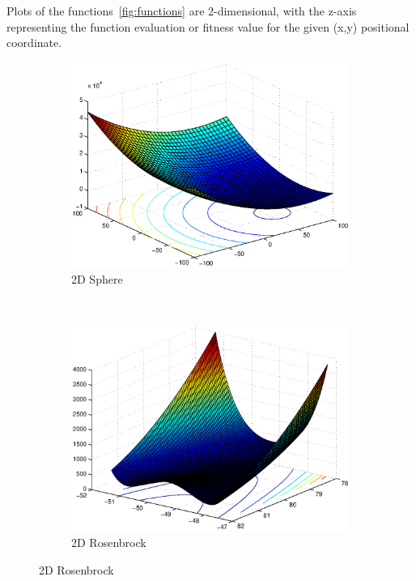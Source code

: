 \documentclass{csfourzero}
\begin{document}
Plots of the functions~\ref{fig:functions} are 2-dimensional, with the z-axis
representing the function evaluation or fitness value for the given (x,y)
positional coordinate.

\begin{figure}
  \centering
  \begin{subfigure}[b]{0.3\textwidth}
    \includegraphics[width=\textwidth]{../functions/sphere_shifted.eps}
    \caption{2D Sphere}
    \label{fig:sphere}
  \end{subfigure}
  ~
  \begin{subfigure}[b]{0.3\textwidth}
    \includegraphics[width=\textwidth]{../functions/rosenbrock_shifted.eps}
    \caption{2D Rosenbrock}
    \label{fig:rosenbrock}
  \end{subfigure}

\end{figure}
\end{document}

